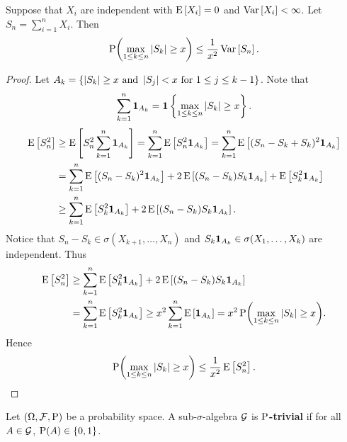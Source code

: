 \begin{theorem}
    Suppose that $X_i$ are independent with $\E\sbrc{X_i} = 0$ and $\Var\sbrc{X_i}<\infty$. 
    Let $S_n = \sum_{i=1}^n X_i$. Then 
    \begin{equation*}
        \P\pth{\max_{1\leq k\leq n}\abs{S_k}\geq x} \leq \frac{1}{x^2}\Var\sbrc{S_n}. 
    \end{equation*}
\end{theorem}
\begin{proof}
    Let $A_k = \set{\abs{S_k}\geq x\text{ and }\abs{S_j}<x\text{ for $1\leq j\leq k-1$}}$. 
    Note that
    \begin{equation*}
        \sum_{k=1}^n\one_{A_k} = \one\set{\max_{1\leq k\leq n}\abs{S_k}\geq x}. 
    \end{equation*} 
    \begin{equation*}
        \begin{split}
            \E\sbrc{S_n^2} &\geq \E\sbrc{S_n^2\sum_{k=1}^n\one_{A_k}} 
            = \sum_{k=1}^n\E\sbrc{S_n^2\one_{A_k}} 
            = \sum_{k=1}^n\E\sbrc{(S_n - S_k + S_k)^2\one_{A_k}} \\
            &= \sum_{k=1}^n \E\sbrc{(S_n-S_k)^2\one_{A_k}} + 2\E\sbrc{(S_n-S_k)S_k\one_{A_k}} + \E\sbrc{S_k^2\one_{A_k}} \\ 
            &\geq \sum_{k=1}^n \E\sbrc{S_k^2\one_{A_k}} + 2\E\sbrc{(S_n-S_k)S_k\one_{A_k}}.
        \end{split}
    \end{equation*}
    Notice that $S_n-S_k\in\sigma(X_{k+1},\ldots,X_n)$ and $S_k\one_{A_k}\in\sigma(X_1,\ldots,X_k)$ 
    are independent. Thus 
    \begin{equation*}
        \begin{split}
            \E\sbrc{S_n^2} &\geq \sum_{k=1}^n \E\sbrc{S_k^2\one_{A_k}} + 2\E\sbrc{(S_n-S_k)S_k\one_{A_k}} \\
            &= \sum_{k=1}^n \E\sbrc{S_k^2\one_{A_k}}\geq x^2\sum_{k=1}^n \E\sbrc{\one_{A_k}}
            = x^2\P\pth{\max_{1\leq k\leq n}\abs{S_k}\geq x}. 
        \end{split} 
    \end{equation*}
    Hence 
    \begin{equation*}
        \P\pth{\max_{1\leq k\leq n}\abs{S_k}\geq x} \leq \frac{1}{x^2}\E\sbrc{S_n^2}. 
    \end{equation*}
\end{proof}

\begin{definition}
    Let $(\Omega,\F,\P)$ be a probability space. A sub-$\sigma$-algebra $\G$ 
    is \textbf{$\P$-trivial} if for all $A\in\G$, $\P(A)\in\set{0,1}$. 
\end{definition}

